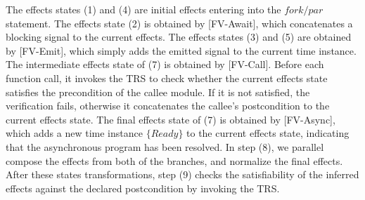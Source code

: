 \documentclass[acmsmall,10pt,review]{acmart}
\newcommand{\code}[1]{{\tt{\ensuremath{\m{#1}}}}}
\newcommand{\m}{\mathit}
\begin{document}
The effects states (1) and (4) are initial effects entering into the \code{fork/par} statement. The effects state (2) is obtained by [FV-Await], which concatenates a blocking signal 
 to the current effects. 
The effects states (3) and (5) are obtained by [FV-Emit], which simply adds the emitted  signal to the current time instance. The intermediate effects state of (7) is obtained by [FV-Call]. 
Before each function call, it invokes the TRS to check whether the current effects state satisfies the precondition of the callee module. If it is not satisfied, the verification fails, otherwise it concatenates the callee's postcondition to the current effects state. The final effects state of (7) is obtained by [FV-Async], which adds a new time instance \code{\{Ready\}} to the current effects state, indicating that the asynchronous program has been resolved. 
In step (8), we parallel compose the effects from both of the branches, and normalize the final effects. 
After these states transformations, step (9) checks the satisfiability of the inferred effects against the declared postcondition by invoking the TRS.
\end{document}
